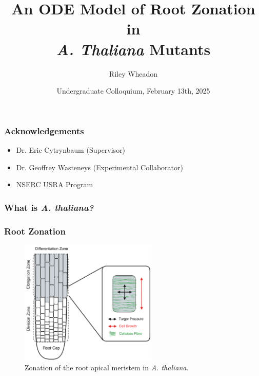 \documentclass{beamer}
\title{An ODE Model of Root Zonation in \\ \emph{A. Thaliana} Mutants}
\author{Riley Wheadon}
\institute{University of British Columbia}
\date{Undergraduate Colloquium, February 13th, 2025}
\begin{document}
\frame{\titlepage}

\begin{frame}
\frametitle{Acknowledgements}
\begin{itemize}
  \item Dr. Eric Cytrynbaum (Supervisor)
  \item Dr. Geoffrey Wasteneys (Experimental Collaborator)
  \item NSERC USRA Program
\end{itemize}
\end{frame}

\begin{frame}
\frametitle{What is \emph{A. thaliana?}}
\end{frame}

\begin{frame}
\frametitle{Root Zonation}
\begin{figure}
  \centering
  \includegraphics[height=16em]{root-zonation-simple.png}
  \caption{Zonation of the root apical meristem in \emph{A. thaliana}.}
\end{figure}
\end{frame}
\end{document}
